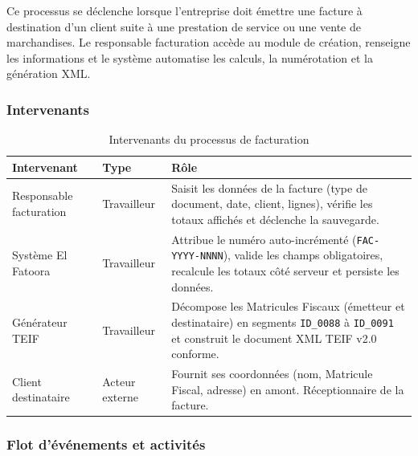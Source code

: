 \documentclass[a4paper,12pt]{report}
\begin{document}
Ce processus se déclenche lorsque l'entreprise doit émettre une facture à destination d'un client suite à une prestation de service ou une vente de marchandises. Le responsable facturation accède au module de création, renseigne les informations et le système automatise les calculs, la numérotation et la génération XML.

\subsubsection*{Intervenants}

\begin{table}[htbp]
\centering
\caption{Intervenants du processus de facturation}
\label{tab:intervenants_a}
\begin{tabularx}{\textwidth}{|l|l|X|}
\hline
\textbf{Intervenant} & \textbf{Type} & \textbf{Rôle} \\
\hline
Responsable facturation & Travailleur & Saisit les données de la facture (type de document, date, client, lignes), vérifie les totaux affichés et déclenche la sauvegarde. \\
\hline
Système El Fatoora & Travailleur & Attribue le numéro auto-incrémenté (\texttt{FAC-YYYY-NNNN}), valide les champs obligatoires, recalcule les totaux côté serveur et persiste les données. \\
\hline
Générateur TEIF & Travailleur & Décompose les Matricules Fiscaux (émetteur et destinataire) en segments \texttt{ID\_0088} à \texttt{ID\_0091} et construit le document XML TEIF v2.0 conforme. \\
\hline
Client destinataire & Acteur externe & Fournit ses coordonnées (nom, Matricule Fiscal, adresse) en amont. Réceptionnaire de la facture. \\
\hline
\end{tabularx}
\end{table}

\subsubsection*{Flot d'événements et activités}
\end{document}

